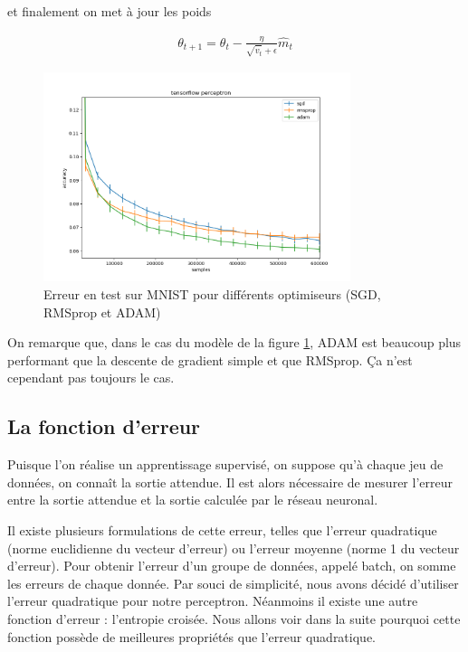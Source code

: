 et finalement on met à jour les poids

\begin{align}
\theta_{t+1} = \theta_t - \frac{\eta}{\sqrt{ \hat{v}_t } + \epsilon} \hat{m}_t 
\end{align}

\begin{figure}[ht]
 \centering
 \includegraphics[width=0.8\textwidth]{img/sgd_rmsprop_adam.png}
 \caption{Erreur en test sur MNIST pour différents optimiseurs (SGD, RMSprop et ADAM)}
 \label{fig:sgd_rmsprop_adam}
\end{figure}

On remarque que, dans le cas du modèle de la figure \ref{fig:sgd_rmsprop_adam}, ADAM est beaucoup plus performant que la descente de gradient simple et que RMSprop. Ça n'est cependant pas toujours le cas.


\subsection{La fonction d'erreur}

Puisque l'on réalise un apprentissage supervisé, on suppose qu'à chaque jeu de données, on connaît la sortie attendue. Il est alors nécessaire de mesurer l'erreur entre la sortie attendue et la sortie calculée par le réseau neuronal.

Il existe plusieurs formulations de cette erreur, telles que l'erreur quadratique (norme euclidienne du vecteur d'erreur) ou l'erreur moyenne (norme 1 du vecteur d'erreur).
Pour obtenir l'erreur d'un groupe de données, appelé batch, on somme les erreurs de chaque donnée. Par souci de simplicité, nous avons décidé d'utiliser l'erreur quadratique pour notre perceptron. Néanmoins il existe une autre fonction d'erreur : l'entropie croisée. Nous allons voir dans la suite pourquoi cette fonction possède de meilleures propriétés que l'erreur quadratique.

